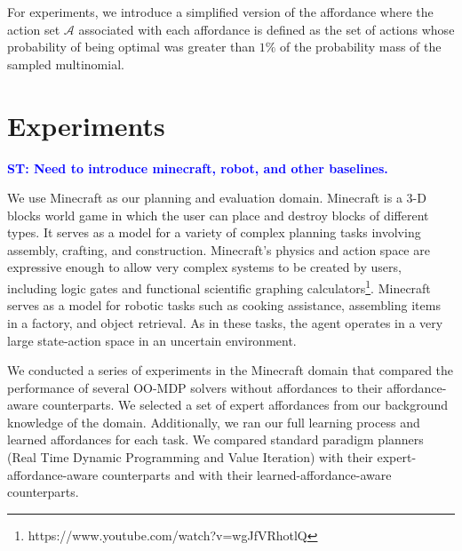 \documentclass[conference]{IEEEtran}
\newcommand{\stnote}[1]{\textcolor{Blue}{\textbf{ST: #1}}}
\begin{document}
For experiments, we introduce a simplified version of the affordance where
the action set $\mathcal{A}$ associated with each affordance is defined
as the set of actions whose probability of being optimal was greater than $1\%$
of the probability mass of the sampled multinomial.


\section{Experiments}
\label{sec:experiments}

\stnote{Need to introduce minecraft, robot, and other baselines.}

We use Minecraft as our planning and evaluation domain. Minecraft is a
 3-D blocks world game in which the user can place and destroy blocks
 of different types. It serves as a model for a variety of complex planning tasks involving 
 assembly, crafting, and construction.  Minecraft's physics and action space are expressive
 enough to allow very complex systems to be created by users, including logic gates and 
 functional scientific graphing calculators\footnote{https://www.youtube.com/watch?v=wgJfVRhotlQ}.
 Minecraft serves as a model for robotic tasks such as cooking assistance, assembling items in a factory, 
 and object retrieval.  As in these tasks, the agent operates in a very large state-action space in an uncertain environment.

We conducted a series of experiments in the Minecraft domain that
compared the performance of several OO-MDP solvers without affordances
to their affordance-aware counterparts. We selected a set of expert
affordances from our background knowledge of the domain. Additionally, we ran our full
learning process and learned affordances for each
task. We compared standard paradigm planners (Real Time Dynamic
Programming and Value Iteration) with their expert-affordance-aware
counterparts and with their learned-affordance-aware counterparts.
\end{document}
